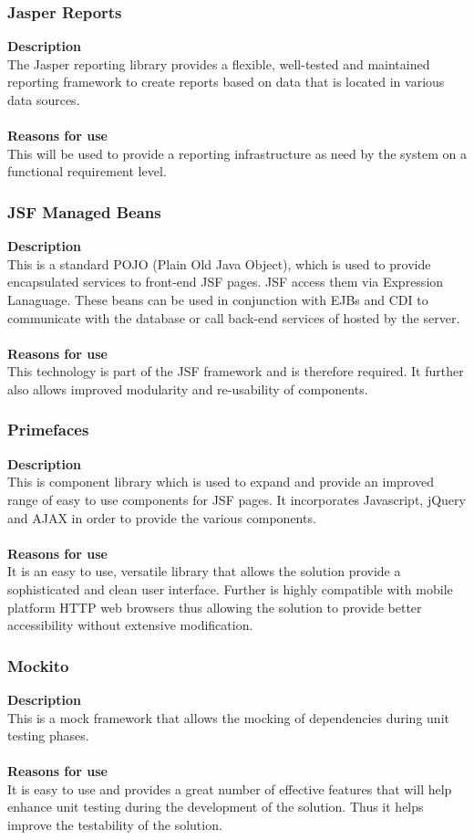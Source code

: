 \documentclass[12pt]{article}
\begin{document}
\subsubsection{Jasper Reports}
\textbf{Description}\\
The Jasper reporting library provides a flexible, well-tested and maintained reporting framework to create reports based on data that is located in various data sources.\\\\
\textbf{Reasons for use}\\
This will be used to provide a reporting infrastructure as need by the system on a functional requirement level.   

\subsubsection{JSF Managed Beans}
\textbf{Description}\\
This is a standard POJO (Plain Old Java Object), which is used to provide encapsulated services to  front-end JSF pages. JSF access them via Expression Lanaguage. These beans can be used in conjunction with EJBs and CDI to communicate with the database or call back-end services of hosted by the server.\\\\
\textbf{Reasons for use}\\
This technology is part of the JSF framework and is therefore required. It further also allows improved modularity and re-usability of components.

\subsubsection{Primefaces}
\textbf{Description}\\
This is component library which is used to expand and provide an improved range of easy to use components for JSF pages. It incorporates Javascript, jQuery and AJAX in order to provide the various components.\\\\
\textbf{Reasons for use}\\
It is an easy to use, versatile library that allows the solution provide a sophisticated and clean user interface. Further is highly compatible with mobile platform HTTP web browsers thus allowing the solution to provide better accessibility without extensive modification.    

\subsubsection{Mockito}
\textbf{Description}\\
This is a mock framework that allows the mocking of dependencies during unit testing phases.\\\\
\textbf{Reasons for use}\\
It is easy to use and provides a great number of effective features that will help enhance unit testing during the development of the solution. Thus it helps improve the testability of the solution.
\end{document}
